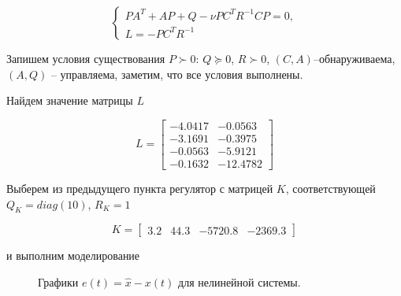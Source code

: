 \begin{equation}
	\begin{cases}
		PA^T+AP+Q-\nu PC^TR^{-1}CP=0,\\
		L = -PC^TR^{-1}
	\end{cases}
\end{equation}

Запишем условия существования $P \succ 0$: $Q \succeq 0$, $R \succ 0$, $(C,A)$--обнаруживаема, $(A,Q)$ -- управляема, заметим, что все условия выполнены.

Найдем значение матрицы $L$

\begin{equation}
	L = \begin{bmatrix}
		    -4.0417 &  -0.0563\\
		 -3.1691 &  -0.3975\\
		 -0.0563 &  -5.9121\\
		 -0.1632 & -12.4782
	\end{bmatrix}
\end{equation}

Выберем из предыдущего пункта регулятор с матрицей $K$, соответствующей $Q_K=diag(10)$, $R_K=1$

 \begin{equation}
	K = \begin{bmatrix}
		3.2 &   44.3 &  -5720.8   &-2369.3
	\end{bmatrix}
\end{equation}

и выполним моделирование

\begin{figure}[!h]
	\caption{Графики $e(t) = \hat{x}-x(t)$ для нелинейной системы.}
	\label{6_kalm_e_1}
\end{figure}


